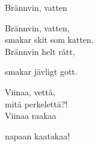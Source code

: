 \begin{song}{Brännvin, vatten}

	
	Brännvin, vatten,\\
	smakar skit som katten.\\
	Brännvin helt rått,\\
	\begin{repetition}
		smakar jävligt gott.
	\end{repetition}
	
	Viinaa, vettä,\\
	mitä perkelettä?!\\
	Viinaa raakaa\\
	\begin{repetition}
		napaan kaatakaa!
	\end{repetition}
	
\end{song}
